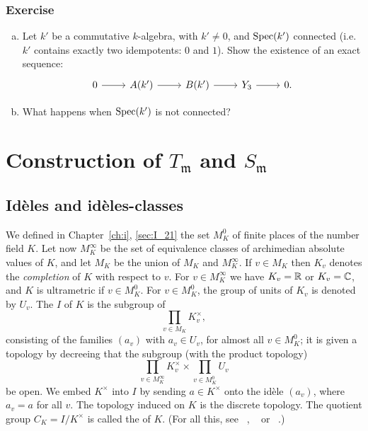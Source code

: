 \subsubsection*{Exercise}
\begin{enumerate}[a)]
	\item Let $k'$ be a commutative $k$-algebra, with $k' \neq 0$, and $\operatorname{Spec}
	(k')$ connected (i.e.\ $k'$ contains exactly two idempotents: $0$ and $1$). 
	Show the existence of an exact sequence:
	\dpage
	\[\begin{tikzcd}
		0 \rar & A(k') \rar & B(k') \rar & Y_3 \rar & 0.
	\end{tikzcd}\]
	\item What happens when $\operatorname{Spec}(k')$ is not connected?
\end{enumerate}

\section{Construction of \texorpdfstring{$T_{\mathfrak{m}}$}{Tm} and
\texorpdfstring{$S_{\mathfrak{m}}$}{Sm}}
\label{sec:II_2}

\subsection{Idèles and idèles-classes}
\label{sec:II_21}
We defined in Chapter~\ref{ch:i}, \ref{sec:I_21} the set $M_K^0$ of finite
places of the number field $K$. Let now $M_K^\infty$
be the set of equivalence classes of archimedian absolute values of $K$, and
let $M_K$ be the union of $M_K$ and $M_K^\infty$. If $v \in
M_K$ then $K_v$ denotes the \emph{completion} of $K$ with respect to $v$. For
$v \in M_K^\infty$ we have $K_v = \mathbb{R}$ or $K_v = \mathbb{C}$, and $K$ is ultrametric if
$v \in M_K^0$. For $v \in M_K^0$, the group of units of $K_v$ is denoted by
$U_v$. The  $I$
of $K$ is the subgroup of
\[
	\prod_{v \in M_K} K_v^\times,
\]
consisting of the families $(a_v)$ with $a_v \in U_v$, for almost all $v \in
M_K^0$; it is given a topology by decreeing that the subgroup (with the product
topology)
\[
	\prod_{v \in M_K^\infty} K_v^\times \times \prod_{v \in M_K^0} U_v
\]
be open. We embed $K^\times$ into $I$ by sending $a \in K^\times$ onto the
idèle $(a_v)$, where $a_v = a$ for all $v$. The topology induced on $K$ is the
discrete topology. The quotient group $C_K = I/K^\times$ is called the  of
$K$.
(For all this, see \citeauthor{6}~\cite{6}, \citeauthor{13}~\cite{13} or
\citeauthor{44}~\cite{44}.)

